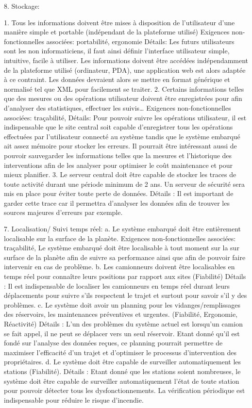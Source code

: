 8. Stockage:

1. Tous les informations doivent être mises à disposition de l'utilisateur d'une manière simple et portable (indépendant de la plateforme utilisé)
Exigences non-fonctionnelles associées: portabilité,  ergonomie
Détails: Les futurs utilisateurs sont les non informaticiens, il faut ainsi définir l’interface utilisateur simple, intuitive, facile à utiliser. Les informations doivent être accédées indépendamment de la plateforme utilisé (ordinateur, PDA), une application web est alors adaptée à ce contraint.  Les données devraient alors se mettre en format générique et normalisé tel que XML pour facilement se traiter.
2. Certains informations telles que des mesures ou des opérations utilisateur doivent être enregistrées pour afin d’analyser des statistiques, effectuer les suivis… 
Exigences non-fonctionnelles associées: traçabilité, 
Détails: Pour pouvoir suivre les opérations utilisateur, il est indispensable que le site central soit capable d’enregistrer tous les opérations effectuées par l’utilisateur connecté au système tandis que le système embarqué ait assez mémoire pour stocker les erreurs. Il pourrait être intéressant aussi de pouvoir sauvegarder les informations telles que la mesures et l’historique des interventions afin de les analyser pour optimiser le coût maintenance et pour mieux planifier.  
3. Le serveur central doit être capable de stocker les traces de toute activité durant une période minimum de 2 ans. Un serveur de sécurité sera mis en place pour éviter toute perte de données. 
Détails : Il est important de garder cette trace car il permettra d’analyser les données afin de trouver les sources majeures d’erreurs par exemple. 

7. Localisation/ Suivi temps réel:
 a. Le système embarqué doit être entièrement localisable sur la surface de la planète. 
Exigences non-fonctionnelles associées: traçabilité, 
Le système embarqué doit être localisable à tout moment sur la sur surface de la planète afin de suivre sa performance ainsi que afin de pouvoir faire intervenir en cas de problème. 
b. Les camionneurs doivent être localisables en temps réel pour connaître leurs positions par rapport aux sites (Fiabilité)
Détails : Il est indispensable de localiser les camionneurs en temps réel durant leurs déplacements pour suivre s’ils respectent le trajet et surtout pour savoir s’il y des problèmes.
c. Le système doit avoir un planning pour les vidanges/remplissages des réservoirs, les maintenances préventives et urgentes. (Fiabilité, Ergonomie, Réactivité)
Détails : L’un des problèmes du système actuel est lorsqu’un camion se fait appel, il ne peut se déplacer vers un seul réservoir. Etant  donné qu’il est fondé sur l’analyse des données reçues, ce planning pourrait permettre de maximiser l’efficacité d’un trajet et d’optimiser le processus d’intervention des propriétaires. 
d. Le système doit être capable de surveiller automatiquement les stations (Fiabilité).
Détails : Etant donné que les stations soient nombreuses, le système doit être capable de surveiller automatiquement  l’état de toute station pour pouvoir détecter tous les dysfonctionnements.  La vérification périodique est indispensable pour réduire le risque d’incendie.  

